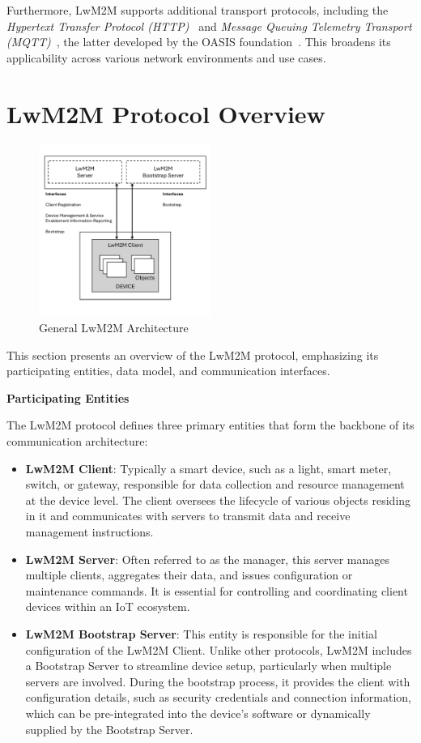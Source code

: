 \documentclass[11pt,sigconf]{iabart}
\begin{document}
Furthermore, LwM2M supports additional transport protocols, including the \textit{Hypertext Transfer Protocol (HTTP)}~\cite{http-spec} and \textit{Message Queuing Telemetry Transport (MQTT)}~\cite{mqtt-spec}, the latter developed by the OASIS foundation~\cite{oasis-foundation}. This broadens its applicability across various network environments and use cases.

\section{LwM2M Protocol Overview} \label{overview}

\begin{figure}[h]
  \centering
  \includegraphics[width=0.5\textwidth]{figs/arch.pdf}
  \caption{General LwM2M Architecture}
  \label{fig:overall_architecture}
\end{figure}

This section presents an overview of the LwM2M protocol, emphasizing its participating entities, data model, and communication interfaces.

\textbf{Participating Entities}

The LwM2M protocol defines three primary entities that form the backbone of its communication architecture:

\begin{itemize}
  \item \textbf{LwM2M Client}: Typically a smart device, such as a light, smart meter, switch, or gateway, responsible for data collection and resource management at the device level. The client oversees the lifecycle of various objects residing in it and communicates with servers to transmit data and receive management instructions.
  \item \textbf{LwM2M Server}: Often referred to as the manager, this server manages multiple clients, aggregates their data, and issues configuration or maintenance commands. It is essential for controlling and coordinating client devices within an IoT ecosystem.
  \item \textbf{LwM2M Bootstrap Server}: This entity is responsible for the initial configuration of the LwM2M Client. Unlike other protocols, LwM2M includes a Bootstrap Server to streamline device setup, particularly when multiple servers are involved. During the bootstrap process, it provides the client with configuration details, such as security credentials and connection information, which can be pre-integrated into the device's software or dynamically supplied by the Bootstrap Server.
\end{itemize}
\end{document}
